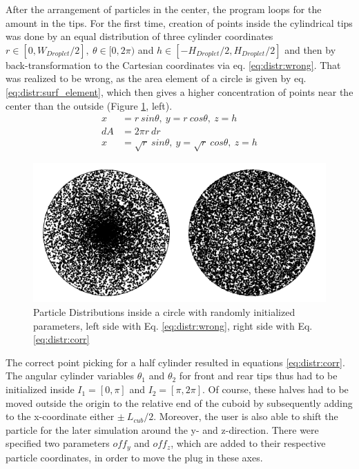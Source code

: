 After the arrangement of particles in the center, the program loops for the amount in the tips. For the first time, creation of points inside the cylindrical tips was done by an equal distribution of three cylinder coordinates $r \in [0,W_{Droplet}/2],\ \theta \in [0,2\pi)$ and $h \in [-H_{Droplet}/2,H_{Droplet}/2] $ and then by back-transformation to the Cartesian coordinates via eq. \ref{eq:distr:wrong}. That was realized to be wrong, as the area element of a circle is given by eq. \ref{eq:distr:surf_element}, which then gives a higher concentration of points near the center than the outside (Figure \ref{sim:distr:wrong}, left).\cite{lit:sim:sphere_point_picking}
\begin{align}
x & = r\ sin \theta,\ y = r\ cos \theta,\ z = h \label{eq:distr:wrong}\\
dA &= 2\pi r\ dr \label{eq:distr:surf_element}\\
x & = \sqrt{r}\ sin \theta,\ y = \sqrt{r}\ cos \theta,\ z = h \label{eq:distr:corr}
\end{align}

\begin{figure}
	\centering
	\includegraphics[scale=.4]{Ressourcen/IMG/CircularDistributionError}
	\caption{Particle Distributions inside a circle with randomly initialized parameters, left side with Eq. \ref{eq:distr:wrong}, right side with Eq.  \ref{eq:distr:corr} \cite{lit:sim:disk_point_picking}}
	\label{sim:distr:wrong}
\end{figure}
The correct point picking for a half cylinder resulted in equations \ref{eq:distr:corr}. The angular cylinder variables $\theta_1$ and $\theta_2$ for front and rear tips thus had to be initialized inside $I_1 = [0,\pi]$ and $I_2 = [\pi,2\pi]$.\cite{lit:sim:disk_point_picking} Of course, these halves had to be moved outside the origin to the relative end of the cuboid by subsequently adding to the x-coordinate either $\pm\ L_{cub}/2$. Moreover, the user is also able to shift the particle for the later simulation around the y- and z-direction. There were specified two parameters $off_y$ and $off_z$, which are added to their respective particle coordinates, in order to move the plug in these axes.

